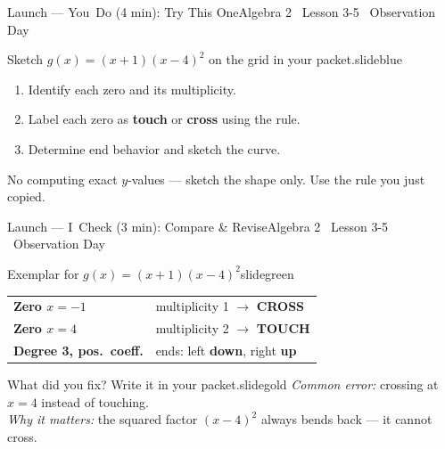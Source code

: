 \documentclass[aspectratio=169, 11pt]{beamer}
\begin{document}
\begin{frame}{Launch --- You~Do (4 min): Try This One}{Algebra 2 \textperiodcentered\ Lesson 3-5 \textperiodcentered\ Observation Day}
\vspace{0.2cm}
\begin{projcard}{Sketch $g(x) = (x+1)(x-4)^2$ on the grid in your packet.}{slideblue}
\begin{enumerate}
  \setlength{\itemsep}{0.2cm}
  \item Identify each zero and its multiplicity.
  \item Label each zero as \textbf{touch} or \textbf{cross} using the rule.
  \item Determine end behavior and sketch the curve.
\end{enumerate}
\vspace{0.2cm}
\small\textcolor{slidegray}{No computing exact $y$-values --- sketch the shape only.
Use the rule you just copied.}
\end{projcard}
\end{frame}

\begin{frame}{Launch --- I~Check (3 min): Compare \& Revise}{Algebra 2 \textperiodcentered\ Lesson 3-5 \textperiodcentered\ Observation Day}
\vspace{0.2cm}
\begin{projcard}{Exemplar for $g(x) = (x+1)(x-4)^2$}{slidegreen}
\begin{tabular}{p{1.6in}p{3.0in}}
\textbf{Zero $x = -1$} & multiplicity 1 $\rightarrow$ \textbf{CROSS} \\[5pt]
\textbf{Zero $x = 4$} & multiplicity 2 $\rightarrow$ \textbf{TOUCH} \\[5pt]
\textbf{Degree 3, pos.\ coeff.} & ends: left \textbf{down}, right \textbf{up} \\
\end{tabular}
\end{projcard}
\vspace{0.15cm}
\begin{projcard}{What did you fix? Write it in your packet.}{slidegold}
\textit{Common error:} crossing at $x = 4$ instead of touching. \\[4pt]
\textit{Why it matters:} the squared factor $(x-4)^2$ always bends back --- it cannot cross.
\end{projcard}
\end{frame}
\end{document}
